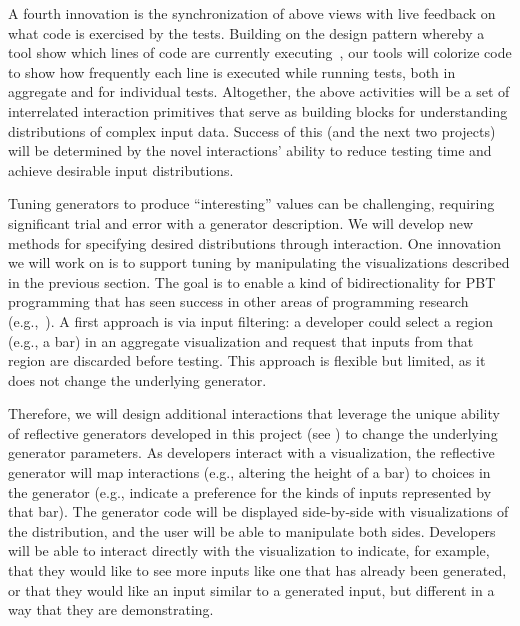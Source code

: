 A fourth innovation is the synchronization of above views with
live feedback on what code is exercised by the tests. Building on the design
pattern whereby a tool show which lines of code are currently
executing~\cite{ref:brandt2010rehearse,
  ref:oney2009firecrystal, ref:burg2013record}, our tools will
colorize code to show
how frequently each line is executed while running tests, both in aggregate and
for individual tests. Altogether, the above activities will be a set of
interrelated interaction primitives that serve as building blocks for
understanding distributions of complex input data. Success of this (and the next
two projects) will be determined by the novel interactions' ability to reduce
testing time and achieve desirable input distributions.


%
Tuning generators to produce ``interesting''
values can be challenging, requiring
significant trial and error with a generator description.
We will develop new methods for specifying desired distributions through interaction. One innovation we
will work on is to support tuning by manipulating the visualizations described in the previous section. The goal is to enable a kind of
bidirectionality for PBT programming that has seen success in other areas of
programming research (e.g.,~\cite{ref:hempel2019sketch, ref:kery2020mage,
  ref:omar2012active, ref:omar2021filling}).
 A first approach is via input filtering: a developer could
select a region (e.g., a bar) in an aggregate visualization and request that
inputs from that region are discarded before testing. This approach is flexible
but limited, as it does not change the underlying generator.

Therefore, we will design additional interactions that leverage the unique
ability of reflective generators developed in this project
(see ) to change the underlying
generator parameters. As developers interact with a visualization,
the reflective generator will map interactions (e.g., altering the height of a bar)
to choices
in the generator (e.g., indicate a preference for the kinds of inputs represented by that bar).  The generator code will be displayed
side-by-side with visualizations of the distribution, and the user
will be able to manipulate both sides.
Developers will be able to interact directly with the visualization to
indicate, for example, that they would like to see more inputs like
one that has already
been generated, or that they would like an input similar to a generated input,
but different in a way that they are demonstrating.

